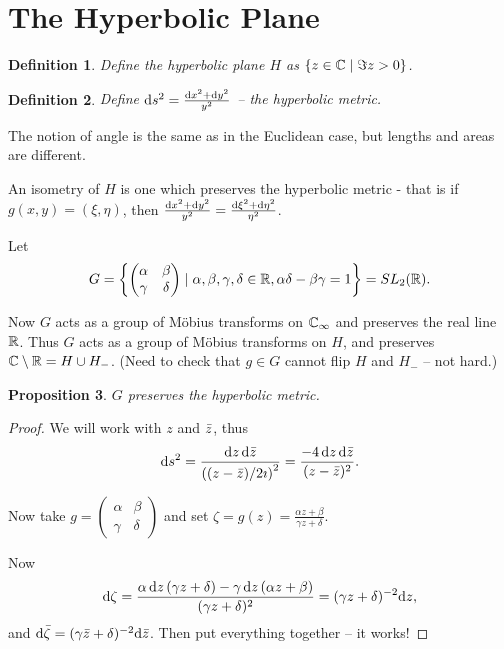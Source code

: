 \documentclass{notes}
\theoremstyle{plain}
\newtheorem{proposition}{Proposition}[chapter]
\newtheorem{definition}[proposition]{Definition}
\newcommand{\Cinf}{\C_\infty}
\begin{document}
\section{The Hyperbolic Plane}

\begin{definition}
Define the hyperbolic plane $H$ as $\{ z \in \mathbb{C} \mid \Im z > 0 \}$.
\end{definition}

\begin{definition}
Define $\mathrm{d} s^2 = \frac{\mathrm{d} x^2 + \mathrm{d} y^2}{y^2}$ -- the hyperbolic metric.
\end{definition}

The notion of angle is the same as in the Euclidean case, but lengths and
areas are different.

An isometry of $H$ is one which preserves the hyperbolic metric - that
is if $g(x,y) = (\xi, \eta)$, then $\frac{\mathrm{d} x^2 + \mathrm{d} y^2}{y^2} =
\frac{\mathrm{d}\xi^2 + \mathrm{d}\eta^2} {\eta^2}$.

Let
\[
G = \left\{
\left(
\begin{matrix}
\alpha & \beta \\ \gamma & \delta
\end{matrix}
\right) \mid \alpha, \beta, \gamma, \delta \in \mathbb{R}, \alpha \delta - \beta \gamma
= 1
\right\} = SL_2(\mathbb{R}).
\]

Now $G$ acts as a group of M\"{o}bius transforms on $\Cinf$ and preserves the
real line $\mathbb{R}$.  Thus $G$ acts as a group of M\"{o}bius transforms on $H$,
and preserves $\mathbb{C} \setminus \mathbb{R} = H \cup H_-$.  (Need to check that $g \in G$
cannot flip $H$ and $H_-$ -- not hard.)

\begin{proposition}
$G$ preserves the hyperbolic metric.
\end{proposition}

\begin{proof}
We will work with $z$ and $\Bar{z}$, thus
\[
\mathrm{d} s^2 = \frac{\mathrm{d} z\, \mathrm{d}\Bar{z}}{\left( (z-\Bar{z})/2\imath \right)^2} =
\frac{-4\, \mathrm{d} z\, \mathrm{d}\Bar{z}}{(z-\Bar{z})^2}.
\]

Now take $g = \left(
\begin{matrix}
\alpha & \beta \\ \gamma & \delta
\end{matrix}
\right)$ and set
$\zeta = g(z) = \frac{\alpha z + \beta}{\gamma z + \delta}$.

Now
\[
\mathrm{d}\zeta = \frac{\alpha\,\mathrm{d} z\,(\gamma z + \delta) - \gamma\,\mathrm{d} z\,(\alpha z +
\beta)}{(\gamma z + \delta)^2} = ( \gamma z + \delta)^{-2} \mathrm{d} z,
\]
and $\mathrm{d}\Bar{\zeta} = ( \gamma \Bar{z} + \delta)^{-2} \mathrm{d}\Bar{z}$.  Then put
everything together -- it works!
\end{proof}
\end{document}
